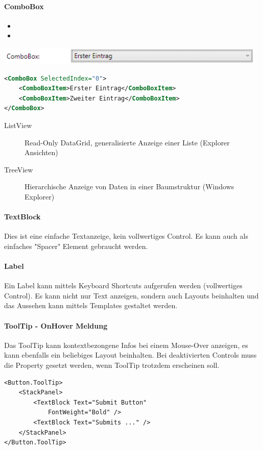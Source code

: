 \paragraph{ComboBox} 
\begin{itemize}
    \item {}
    \item {}
\end{itemize}
\includegraphics[scale=0.4]{img/ComboBox.png}
\begin{lstlisting}[language=xml]
<ComboBox SelectedIndex="0">
    <ComboBoxItem>Erster Eintrag</ComboBoxItem>
    <ComboBoxItem>Zweiter Eintrag</ComboBoxItem>
</ComboBox>
\end{lstlisting}
\begin{description}
    \item[ListView] Read-Only DataGrid, generalisierte Anzeige einer Liste (Explorer Ansichten)
    \item[TreeView] Hierarchische Anzeige von Daten in einer Baumstruktur (Windows Explorer)
\end{description}

\paragraph{TextBlock} Dies ist eine einfache Textanzeige, kein vollwertiges Control. Es kann auch als einfaches "{}Spacer"{} Element gebraucht werden.

\paragraph{Label} Ein Label kann mittels Keyboard Shortcuts aufgerufen werden (vollwertiges Control). Es kann nicht nur Text anzeigen, sondern auch Layouts beinhalten und das Aussehen kann mittels Templates gestaltet werden.

\paragraph{ToolTip - OnHover Meldung} Das ToolTip kann kontextbezongene Infos bei einem Mouse-Over anzeigen, es kann ebenfalls ein beliebiges Layout beinhalten. Bei deaktivierten Controls muss die Property  gesetzt werden, wenn ToolTip trotzdem erscheinen soll.
\begin{lstlisting}
<Button.ToolTip>
    <StackPanel>
        <TextBlock Text="Submit Button"
            FontWeight="Bold" />
        <TextBlock Text="Submits ..." />
    </StackPanel>
</Button.ToolTip>
\end{lstlisting}


